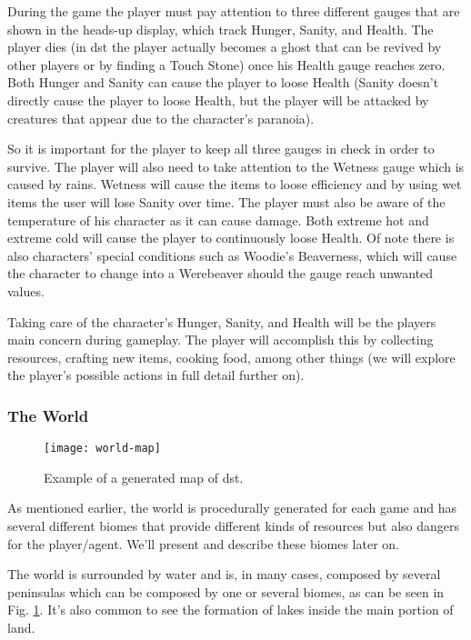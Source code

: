 During the game the player must pay attention to three different gauges that are shown in the heads-up display, which track Hunger, Sanity, and Health.
The player dies (in \gls{dst} the player actually becomes a ghost that can be revived by other players or by finding a Touch Stone) once his Health gauge reaches zero.
Both Hunger and Sanity can cause the player to loose Health (Sanity doesn't directly cause the player to loose Health, but the player will be attacked by creatures that appear due to the character's paranoia).

So it is important for the player to keep all three gauges in check in order to survive.
The player will also need to take attention to the Wetness gauge which is caused by rains. Wetness will cause the items to loose efficiency and by using wet items the user will lose Sanity over time.
The player must also be aware of the temperature of his character as it can cause damage. Both extreme hot and extreme cold will cause the player to continuously loose Health.
Of note there is also characters' special conditions such as Woodie's Beaverness, which will cause the character to change into a Werebeaver should the gauge reach unwanted values.

Taking care of the character's Hunger, Sanity, and Health will be the players main concern during gameplay.
The player will accomplish this by collecting resources, crafting new items, cooking food, among other things (we will explore the player's possible actions in full detail further on).

\subsubsection{The World}

\begin{figure}
  \centering
    \texttt{[image: world-map]}
  \caption{Example of a generated map of \gls{dst}.}
  \label{fig:world-map}
\end{figure}
As mentioned earlier, the world is procedurally generated for each game and has several different biomes that provide different kinds of resources but also dangers for the player/agent. 
We'll present and describe these biomes later on.

The world is surrounded by water and is, in many cases, composed by several peninsulas which can be composed by one or several biomes, as can be seen in Fig. \ref{fig:world-map}.
It's also common to see the formation of lakes inside the main portion of land.

